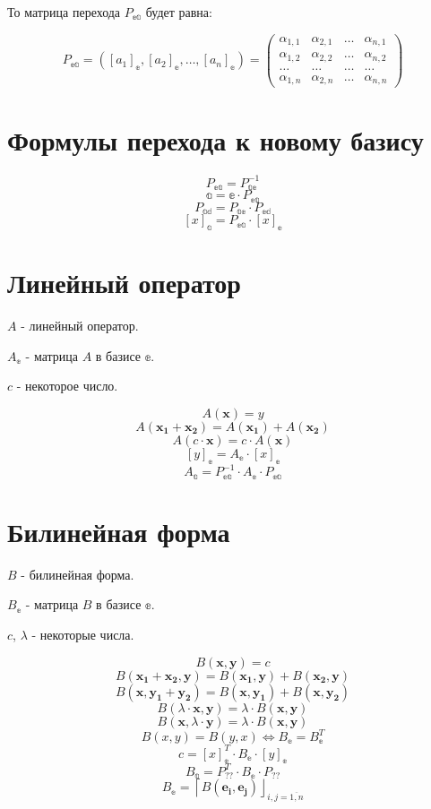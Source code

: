 То матрица перехода $P_\mathbb{ea}$ будет равна:

\[
P_\mathbb{ea} = 
\left([a_1]_\mathbb{e}, [a_2]_\mathbb{e}, \dots, [a_n]_\mathbb{e}\right) = 
\begin{pmatrix}
	\alpha_{1,1}& \alpha_{2, 1}& \dots& \alpha_{n,1}\\
	\alpha_{1,2}& \alpha_{2, 2}& \dots& \alpha_{n,2}\\
	\dots& \dots& \dots& \dots\\
	\alpha_{1,n}& \alpha_{2, n}& \dots& \alpha_{n,n}
\end{pmatrix}
\]

\section{Формулы перехода к новому базису}

$$ P_\mathbb{ea} = P_\mathbb{ae}^{-1} $$
$$ \mathbb{a} = \mathbb{e} \cdot P_\mathbb{ea} $$
$$ P_\mathbb{ad} = P_\mathbb{ae}\cdot P_\mathbb{ed} $$
$$ [x]_\mathbb{a} = P_\mathbb{ea} \cdot [x]_\mathbb{e} $$

\section{Линейный оператор}

$A$ - линейный оператор.

$A_\mathbb{e}$ - матрица $A$ в базисе $\mathbb{e}$.

$c$ - некоторое число.
 
$$ A(\boldsymbol{x}) = y $$
$$ A(\boldsymbol{x_1} + \boldsymbol{x_2}) = A(\boldsymbol{x_1}) + A(\boldsymbol{x_2}) $$
$$ A(c\cdot\boldsymbol{x}) = c\cdot A(\boldsymbol{x}) $$
$$ [y]_\mathbb{e} = A_\mathbb{e} \cdot [x]_\mathbb{e} $$
$$ A_\mathbb{a} = P_\mathbb{ea}^{-1} \cdot A_\mathbb{e} \cdot P_\mathbb{ea} $$

\section{Билинейная форма}

$B$ - билинейная форма.

$B_\mathbb{e}$ - матрица $B$ в базисе $\mathbb{e}$.

$c$, $\lambda$ - некоторые числа.

$$ B(\boldsymbol{x}, \boldsymbol{y}) = c$$
$$ B(\boldsymbol{x_1} + \boldsymbol{x_2}, \boldsymbol{y}) = B(\boldsymbol{x_1}, \boldsymbol{y}) + B(\boldsymbol{x_2}, \boldsymbol{y}) $$
$$ B(\boldsymbol{x}, \boldsymbol{y_1} + \boldsymbol{y_2}) = B(\boldsymbol{x}, \boldsymbol{y_1}) + B(\boldsymbol{x}, \boldsymbol{y_2}) $$
$$ B(\lambda\cdot \boldsymbol{x}, \boldsymbol{y}) =  \lambda\cdot B(\boldsymbol{x}, \boldsymbol{y})$$
$$ B(\boldsymbol{x}, \lambda\cdot \boldsymbol{y}) =  \lambda\cdot B(\boldsymbol{x}, \boldsymbol{y})$$
$$ B(x, y) = B(y, x) \Leftrightarrow B_\mathbb{e} = B_\mathbb{e}^T $$
$$ c = [x]_\mathbb{e}^T \cdot B_\mathbb{e} \cdot [y]_\mathbb{e} $$
$$ B_\mathbb{a} = P_\mathbb{??}^T \cdot B_\mathbb{e} \cdot P_\mathbb{??} $$
$$ B_\mathbb{e} = \left\lceil B(\boldsymbol{e_i},\boldsymbol{e_j})\right\rfloor_{i,j=\overline{1,n}} $$

